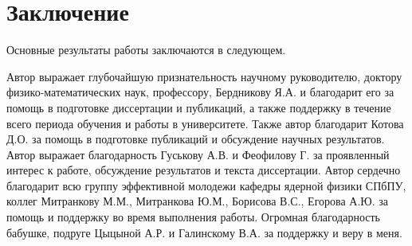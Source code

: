 \chapter*{Заключение}                       %


Основные результаты работы заключаются в следующем.


Автор выражает глубочайшую признательность научному руководителю, доктору физико-математических наук, профессору, Бердникову Я.А. и благодарит его за помощь в подготовке диссертации и публикаций, а также поддержку в течение всего периода обучения и работы в университете. Также автор благодарит Котова Д.О. за помощь в подготовке публикаций и обсуждение научных результатов. Автор выражает благодарность Гуськову А.В. и Феофилову Г. за проявленный интерес к работе, обсуждение результатов и текста диссертации. Автор сердечно благодарит всю группу эффективной молодежи кафедры ядерной физики СПбПУ, коллег Митранкову М.М., Митранкова Ю.М., Борисова В.С., Егорова А.Ю. за помощь и поддержку во время выполнения работы.
Огромная благодарность бабушке, подруге Цыцыной А.Р. и Галинскому В.А. за поддержку и веру в меня.

